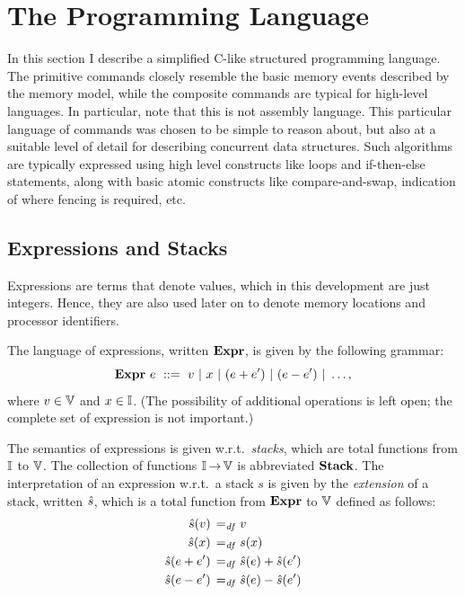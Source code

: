 \documentclass[11pt]{article}
\begin{document}
\section{The Programming Language}
\label{sec:programming-language}

In this section I describe a simplified C-like structured programming language. The primitive commands closely resemble the basic memory events described by the memory model, while the composite commands are typical for high-level languages. In particular, note that this is not assembly language. This particular language of commands was chosen to be simple to reason about, but also at a suitable level of detail for describing concurrent data structures. Such algorithms are typically expressed using high level constructs like loops and if-then-else statements, along with basic atomic constructs like compare-and-swap, indication of where fencing is required, etc. 

\subsection{Expressions and Stacks}
\label{sec:expressions}

Expressions are terms that denote values, which in this development are just integers. Hence, they are also used later on to denote memory locations and processor identifiers. 

The language of expressions, written $\mathbf{Expr}$, is given by the following grammar: \[ \mathbf{Expr}~e ~::=~ v ~|~ x ~|~ (e + e') ~|~ (e - e') ~|~ \ldots, \] where $v \in \mathbb{V}$ and $x \in \mathbb{I}$. (The possibility of additional operations is left open; the complete set of expression is not important.)

The semantics of expressions is given w.r.t.~\emph{stacks}, which are total functions from $\mathbb{I}$ to $\mathbb{V}$. The collection of functions $\mathbb{I} \operatorname{\rightarrow} \mathbb{V}$ is abbreviated $\mathbf{Stack}$. The interpretation of an expression w.r.t.~a stack $s$ is given by the \emph{extension} of a stack, written $\hat{s}$, which is a total function from $\mathbf{Expr}$ to $\mathbb{V}$ defined as follows: \begin{align*}
	\hat{s}(v) \operatorname{\;=_{\mathit{df}}\;} & v \\
	\hat{s}(x) \operatorname{\;=_{\mathit{df}}\;} & s(x) \\
	\hat{s}(e + e') \operatorname{\;=_{\mathit{df}}\;} & \hat{s}(e) + \hat{s}(e') \\
	\hat{s}(e - e') \operatorname{\;=_{\mathit{df}}\;} & \hat{s}(e) - \hat{s}(e')
\end{align*}  
\end{document}
